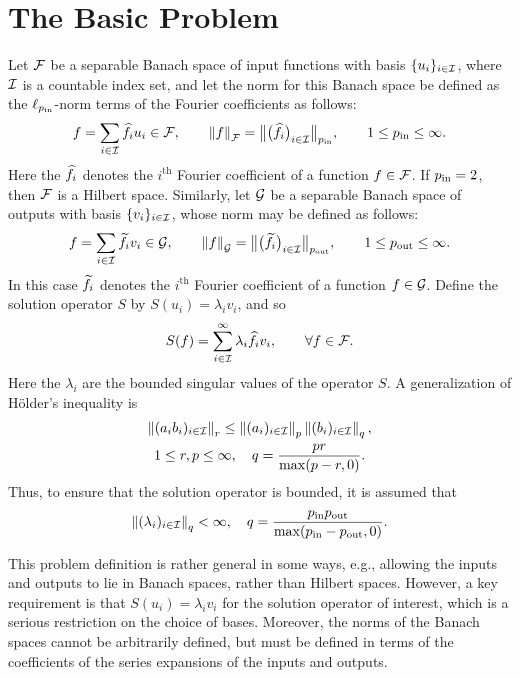 \documentclass[final]{elsarticle}
\newcommand{\pin}{p_{\text{\rm{in}}}}
\newcommand{\pout}{p_{\text{\rm{out}}}}
\theoremstyle{definition}
\theoremstyle{remark}
\begin{document}
\section{The Basic Problem}
Let $\cf$ be a separable Banach space of input functions with basis $\{u_i\}_{i\in\ci}$, where $\ci$ is a countable index set, and let the norm for this Banach space be defined as the $\ell_{\pin}$-norm terms of the Fourier coefficients as follows:
\begin{equation*}
f = \sum_{i \in \ci} \hf_i u_i \in \cf, \qquad \norm[\cf]{f}=\big\lVert\big(\hf_i\big)_{i\in \ci}\big\rVert_{\pin}, \qquad 1 \le \pin \le \infty.
\end{equation*}
Here the $\hf_i$ denotes the $i^{\text{th}}$ Fourier coefficient of a function $f\in \cf$.  If $\pin=2$, then $\cf$ is a Hilbert space.  Similarly, let $\cg$ be a separable Banach space of outputs  with basis $\{v_i\}_{i \in \ci}$, whose norm may be defined as follows:
\begin{equation*}
f = \sum_{i \in \ci} \tf_i v_i \in \cg, \qquad \norm[\cg]{f}=\big\lVert\big(\tf_i\big)_{i\in \ci}\big\rVert_{\pout}, \qquad 1 \le \pout \le \infty.
\end{equation*}
In this case $\tf_i$ denotes the $i^{\text{th}}$ Fourier coefficient of a function $f\in \cg$.  Define the solution operator $S$ by $S(u_i) = \lambda_i v_i$, and so
\begin{equation} \label{HilbertS}
S(f) = \sum_{i \in \ci}^\infty \lambda_i \hf_i v_i, \qquad \forall f \in \cf.
\end{equation}
Here the $\lambda_i$ are the bounded singular values of the operator $S$.  A generalization of H\"older's inequality is
\begin{multline} \label{HoldIneq}
\norm[r]{(a_ib_i)_{i \in \ci}} \le \norm[p]{(a_i)_{i \in \ci}} \norm[q]{(b_i)_{i \in \ci}}, \\
1 \le r, p \le \infty, \quad  q= \frac{pr}{\max(p-r,0)}.
\end{multline}
Thus, to ensure that the solution operator is bounded, it is assumed that
\begin{equation} \label{lamcond}
\norm[q]{(\lambda_i)_{i \in \ci}}<\infty, \quad  q= \frac{\pin\pout}{\max(\pin-\pout,0)}.
\end{equation}

This problem definition is rather general in some ways, e.g., allowing the inputs and outputs to lie in Banach spaces, rather than Hilbert spaces.  However, a key requirement is that $S(u_i)=\lambda_i v_i$ for the solution operator of interest, which is a serious restriction on the choice of bases.  Moreover, the norms of the Banach spaces cannot be arbitrarily defined, but must be defined in terms of the coefficients of the series expansions of the inputs and outputs.
\end{document}
